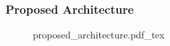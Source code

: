 \documentclass{beamer}
\begin{document}

	\begin{frame}
		\frametitle{Proposed Architecture}
		\begin{figure}[hb]
			\footnotesize
			\centering
			\def\svgwidth{\columnwidth}
			{proposed_architecture.pdf_tex}
		\end{figure}
	\end{frame}
\end{document}
